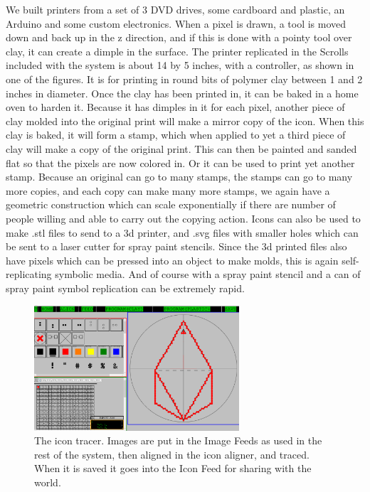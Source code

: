 We built printers from a set of 3 DVD drives, some cardboard and plastic, an Arduino and some custom electronics.  When a pixel is drawn, a tool is moved down and back up in the z direction, and if this is done with a pointy tool over clay, it can create a dimple in the surface.  The printer replicated in the Scrolls included with the system is about 14 by 5 inches, with a controller, as shown in one of the figures.  It is for printing in round bits of polymer clay between 1 and 2 inches in diameter.  Once the clay has been printed in, it can be baked in a home oven to harden it.  Because it has dimples in it for each pixel, another piece of clay molded into the original print will make a mirror copy of the icon.  When this clay is baked, it will form a stamp, which when applied to yet a third piece of clay will make a copy of the original print.  This can then be painted and sanded flat so that the pixels are now colored in.  Or it can be used to print yet another stamp.  Because an original can go to many stamps, the stamps can go to many more copies, and each copy can make many more stamps, we again have a geometric construction which can scale exponentially if there are number of people willing and able to carry out the copying action.  Icons can also be used to make .stl files to send to a 3d printer, and .svg files with smaller holes which can be sent to a laser cutter for spray paint stencils.  Since the 3d printed files also have pixels which can be pressed into an object to make molds, this is again self-replicating symbolic media.  And of course with a spray paint stencil and a can of spray paint symbol replication can be extremely rapid.  


\begin{figure}
	\centering
	\includegraphics[width=3in]{figures/machines/trace.png}
	\caption[trace]
	{The icon tracer.  Images are put in the Image Feeds as used in the rest of the system, then aligned in the icon aligner, and traced.  When it is saved it goes into the Icon Feed for sharing with the world.}
\end{figure}

